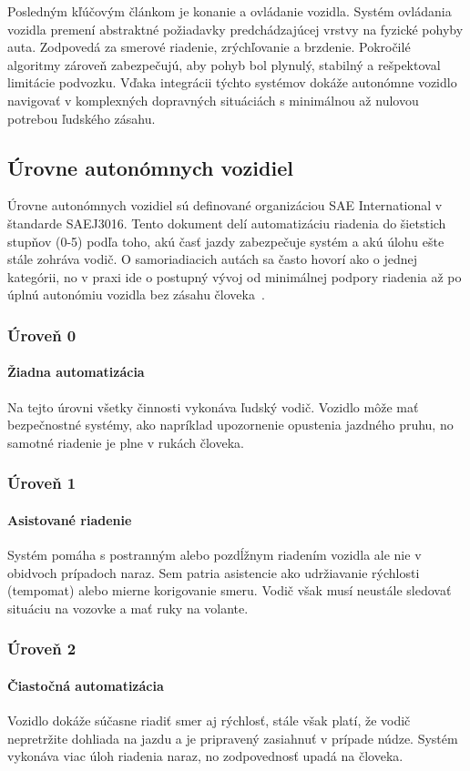 Posledným kľúčovým článkom je konanie a ovládanie vozidla. Systém ovládania vozidla premení abstraktné požiadavky predchádzajúcej vrstvy na fyzické pohyby auta. Zodpovedá za smerové riadenie, zrýchľovanie a brzdenie. Pokročilé algoritmy zároveň zabezpečujú, aby pohyb bol plynulý, stabilný a rešpektoval limitácie podvozku. Vďaka integrácii týchto systémov dokáže autonómne vozidlo navigovať v komplexných dopravných situáciách s minimálnou až nulovou potrebou ľudského zásahu.

\subsection{Úrovne autonómnych vozidiel}
Úrovne autonómnych vozidiel sú definované organizáciou SAE International v štandarde SAEJ3016. Tento dokument delí automatizáciu riadenia do šietstich stupňov (0-5) podľa toho, akú časť jazdy zabezpečuje systém a akú úlohu ešte stále zohráva vodič. O samoriadiacich autách sa často hovorí ako o jednej kategórii, no v praxi ide o postupný vývoj od minimálnej podpory riadenia až po úplnú autonómiu vozidla bez zásahu človeka~\cite{saej3016}.
\subsubsection{Úroveň 0}
\paragraph{Žiadna automatizácia}Na tejto úrovni všetky činnosti vykonáva ľudský vodič. Vozidlo môže mať bezpečnostné systémy, ako napríklad upozornenie opustenia jazdného pruhu, no samotné riadenie je plne v rukách človeka.
\subsubsection{Úroveň 1}
\paragraph{Asistované riadenie}Systém pomáha s postranným alebo pozdĺžnym riadením vozidla ale nie v obidvoch prípadoch naraz. Sem patria asistencie ako udržiavanie rýchlosti (tempomat) alebo mierne korigovanie smeru. Vodič však musí neustále sledovať situáciu na vozovke a mať ruky na volante.
\subsubsection{Úroveň 2}
\paragraph{Čiastočná automatizácia}Vozidlo dokáže súčasne riadiť smer aj rýchlosť, stále však platí, že vodič nepretržite dohliada na jazdu a je pripravený zasiahnuť v prípade núdze. Systém vykonáva viac úloh riadenia naraz, no zodpovednosť upadá na človeka.
